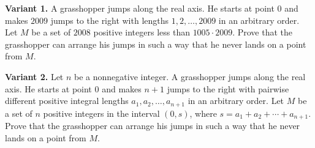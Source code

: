 \textbf{Variant 1.} A grasshopper jumps along the real axis. He starts at point $0$ and makes $2009$ jumps to the right with lengths $1, 2, \ldots, 2009$ in an arbitrary order. Let $M$ be a set of $2008$ positive integers less than $1005 \cdot 2009$. Prove that the grasshopper can arrange his jumps in such a way that he never lands on a point from $M$.

\textbf{Variant 2.} Let $n$ be a nonnegative integer. A grasshopper jumps along the real axis. He starts at point $0$ and makes $n+1$ jumps to the right with pairwise different positive integral lengths $a_1, a_2, \ldots, a_{n+1}$ in an arbitrary order. Let $M$ be a set of $n$ positive integers in the interval $(0, s)$, where $s = a_1 + a_2 + \cdots + a_{n+1}$. Prove that the grasshopper can arrange his jumps in such a way that he never lands on a point from $M$.
